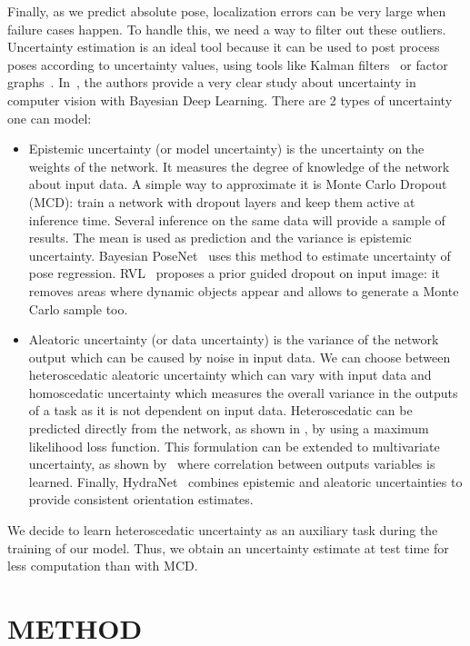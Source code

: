 \documentclass[10pt,twocolumn,letterpaper]{article}
\begin{document}
Finally, as we predict absolute pose, localization errors can be very large when failure cases happen. To handle this, we need a way to filter out these outliers. Uncertainty estimation is an ideal tool because it can be used to post process poses according to uncertainty values, using tools like Kalman filters~\cite{zhou2020kfnet} or factor graphs~\cite{Dellaert2017}. In~\cite{whatuncertainties}, the authors provide a very clear study about uncertainty in computer vision with Bayesian Deep Learning. There are 2 types of uncertainty one can model:
\begin{itemize}
    \item Epistemic uncertainty (or model uncertainty) is the uncertainty on the weights of the network. It measures the degree of knowledge of the network about input data. A simple way to approximate it is Monte Carlo Dropout~\cite{gal2016dropout} (MCD): train a network with dropout layers and keep them active at inference time. Several inference on the same data will provide a sample of results. The mean is used as prediction and the variance is epistemic uncertainty. Bayesian PoseNet~\cite{bayesianposenet} uses this method to estimate uncertainty of pose regression. RVL~\cite{RVL} proposes a prior guided dropout on input image: it removes areas where dynamic objects appear and allows to generate a Monte Carlo sample too.
    \item Aleatoric uncertainty (or data uncertainty) is the variance of the network output which can be caused by noise in input data. We can choose between heteroscedatic aleatoric uncertainty which can vary with input data and homoscedatic uncertainty which measures the overall variance in the outputs of a task as it is not dependent on input data. Heteroscedatic can be predicted directly from the network, as shown in \cite{lakshminarayanan2017simple,whatuncertainties}, by using a maximum likelihood loss function. This formulation can be extended to multivariate uncertainty, as shown by~\cite{multivariate} where correlation between outputs variables is learned. Finally, HydraNet~\cite{peretroukhin2019probabilistic} combines epistemic and aleatoric uncertainties to provide consistent orientation estimates.
\end{itemize}
We decide to learn heteroscedatic uncertainty as an auxiliary task during the training of our model. Thus, we obtain an uncertainty estimate at test time for less computation than with MCD.   
\section{METHOD}
\label{sec:method}
\end{document}
